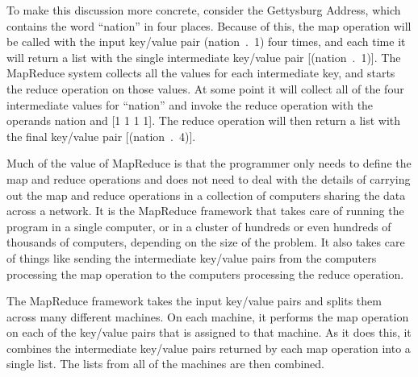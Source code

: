 To make this discussion more concrete, consider the Gettysburg Address,
which contains the word ``nation'' in four places. Because of this,
the map operation will be called with the input key/value pair \textsf{(nation~.~1)}
four times, and each time it will return a list with
the single intermediate key/value pair \textsf{[(nation~.~1)]}. The MapReduce
system collects all the values for each intermediate key, and starts the reduce
operation on those values. 
At some point it will collect all of the four intermediate
values for ``nation'' and invoke the reduce operation with the operands
\textsf{nation} and \textsf{[1 1 1 1]}. 
The reduce operation will then
return a list with the final key/value pair \textsf{[(nation~.~4)]}.


Much of the value of MapReduce is that the programmer only needs to
define the map and reduce operations and 
does not need to deal with the details of carrying out the map and reduce
operations in a collection of computers sharing the data across a
network.  It is the MapReduce
framework that takes care of running the program in a single
computer, or in a cluster of hundreds or even hundreds of thousands
of computers, depending on the size of the problem. 
It also takes care of things like 
sending the intermediate key/value pairs
from the computers processing the map operation to the computers
processing the reduce operation.

The MapReduce framework
takes the input key/value pairs and splits them across many
different machines.  On each machine, it performs the map
operation on each of the key/value pairs that is assigned to
that machine.  As it does this, it combines the intermediate
key/value pairs returned by each map operation into a single
list.  The lists from all of the machines are then combined.

